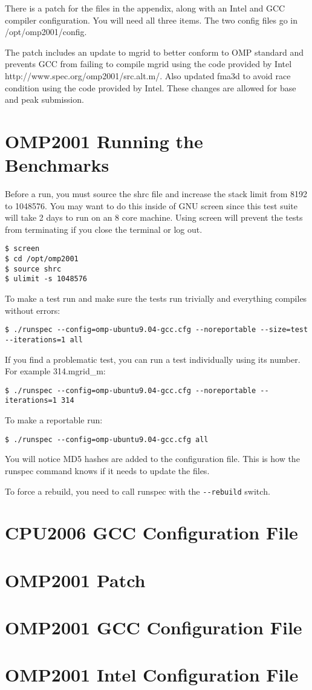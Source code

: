 \documentclass[12pt,twoside,a4paper]{article}
\begin{document}
There is a patch for the files in the appendix, along with an Intel and GCC compiler configuration. You will need all three items. The two config files go in /opt/omp2001/config.

The patch includes an update to mgrid to better conform to OMP standard and prevents GCC from failing to compile mgrid using the code provided by Intel http://www.spec.org/omp2001/src.alt.m/. Also updated fma3d to avoid race condition using the code provided by Intel. These changes are allowed for base and peak submission.

\section{OMP2001 Running the Benchmarks}
Before a run, you must source the shrc file and increase the stack limit from 8192 to 1048576. You may want to do this inside of GNU screen since this test suite will
take 2 days to run on an 8 core machine. Using screen will prevent the tests from terminating if you close the terminal or log out.
\begin{lstlisting}
$ screen
$ cd /opt/omp2001
$ source shrc
$ ulimit -s 1048576
\end{lstlisting}

To make a test run and make sure the tests run trivially and everything compiles without errors:
\begin{lstlisting}
$ ./runspec --config=omp-ubuntu9.04-gcc.cfg --noreportable --size=test --iterations=1 all
\end{lstlisting}

If you find a problematic test, you can run a test individually using its number. For example 314.mgrid\_m:
\begin{lstlisting}
$ ./runspec --config=omp-ubuntu9.04-gcc.cfg --noreportable --iterations=1 314
\end{lstlisting}

To make a reportable run:
\begin{lstlisting}
$ ./runspec --config=omp-ubuntu9.04-gcc.cfg all
\end{lstlisting}

You will notice MD5 hashes are added to the configuration file. This is how the runspec command knows if it needs to update the files.

To force a rebuild, you need to call runspec with the \verb,--rebuild, switch.

\appendix
\section{CPU2006 GCC Configuration File}

\section{OMP2001 Patch}

\section{OMP2001 GCC Configuration File}

\section{OMP2001 Intel Configuration File}

\end{document}
